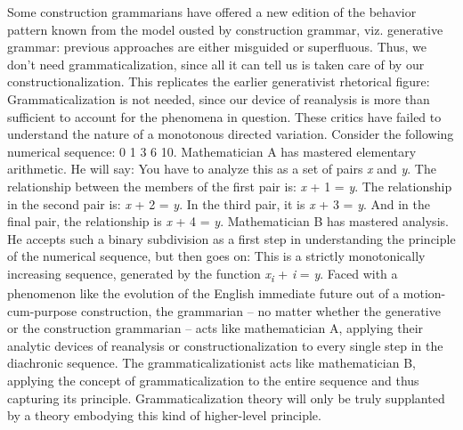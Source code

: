 Some construction grammarians have offered a new edition of the behavior pattern known from the model ousted by construction grammar, viz. generative grammar: previous approaches are either misguided or superfluous. Thus, we don’t need grammaticalization, since all it can tell us is taken care of by our constructionalization. This replicates the earlier generativist rhetorical figure: Grammaticalization is not needed, since our device of reanalysis is more than sufficient to account for the phenomena in question. These critics have failed to understand the nature of a monotonous directed variation. Consider the following numerical sequence: 0 1 3 6 10. Mathematician A has mastered elementary arithmetic. He will say: You have to analyze this as a set of pairs \textit{x} and \textit{y}. The relationship between the members of the first pair is: \textit{x} + 1 = \textit{y}. The relationship in the second pair is: \textit{x} + 2 = \textit{y}. In the third pair, it is \textit{x} + 3 = \textit{y}. And in the final pair, the relationship is \textit{x} + 4 = \textit{y}. Mathematician B has mastered analysis. He accepts such a binary subdivision as a first step in understanding the principle of the numerical sequence, but then goes on: This is a strictly monotonically increasing sequence, generated by the function \textit{x\textsubscript{i}} + \textit{i} = \textit{y}. Faced with a phenomenon like the evolution of the English immediate future out of a motion-cum-purpose construction, the grammarian – no matter whether the generative or the construction grammarian – acts like mathematician A, applying their analytic devices of reanalysis or constructionalization to every single step in the diachronic sequence. The grammaticalizationist acts like mathematician B, applying the concept of grammaticalization to the entire sequence and thus capturing its principle. Grammaticalization theory will only be truly supplanted by a theory embodying this kind of higher-level principle.
